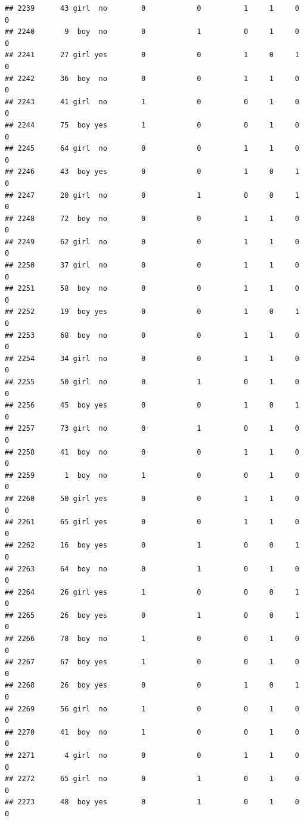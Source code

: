 \documentclass[man]{apa6}
\begin{document}
\begin{verbatim}
## 2239      43 girl  no        0            0          1     1     0     0
## 2240       9  boy  no        0            1          0     1     0     0
## 2241      27 girl yes        0            0          1     0     1     0
## 2242      36  boy  no        0            0          1     1     0     0
## 2243      41 girl  no        1            0          0     1     0     0
## 2244      75  boy yes        1            0          0     1     0     0
## 2245      64 girl  no        0            0          1     1     0     0
## 2246      43  boy yes        0            0          1     0     1     0
## 2247      20 girl  no        0            1          0     0     1     0
## 2248      72  boy  no        0            0          1     1     0     0
## 2249      62 girl  no        0            0          1     1     0     0
## 2250      37 girl  no        0            0          1     1     0     0
## 2251      58  boy  no        0            0          1     1     0     0
## 2252      19  boy yes        0            0          1     0     1     0
## 2253      68  boy  no        0            0          1     1     0     0
## 2254      34 girl  no        0            0          1     1     0     0
## 2255      50 girl  no        0            1          0     1     0     0
## 2256      45  boy yes        0            0          1     0     1     0
## 2257      73 girl  no        0            1          0     1     0     0
## 2258      41  boy  no        0            0          1     1     0     0
## 2259       1  boy  no        1            0          0     1     0     0
## 2260      50 girl yes        0            0          1     1     0     0
## 2261      65 girl yes        0            0          1     1     0     0
## 2262      16  boy yes        0            1          0     0     1     0
## 2263      64  boy  no        0            1          0     1     0     0
## 2264      26 girl yes        1            0          0     0     1     0
## 2265      26  boy yes        0            1          0     0     1     0
## 2266      78  boy  no        1            0          0     1     0     0
## 2267      67  boy yes        1            0          0     1     0     0
## 2268      26  boy yes        0            0          1     0     1     0
## 2269      56 girl  no        1            0          0     1     0     0
## 2270      41  boy  no        1            0          0     1     0     0
## 2271       4 girl  no        0            0          1     1     0     0
## 2272      65 girl  no        0            1          0     1     0     0
## 2273      48  boy yes        0            1          0     1     0     0

\end{verbatim}
\end{document}
